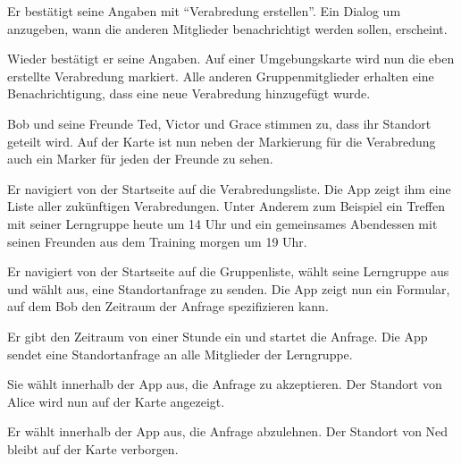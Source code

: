 \documentclass[parskip=full,11pt]{scrartcl}
\begin{document}
{Er bestätigt seine Angaben mit \enquote{Verabredung erstellen}.}
{Ein Dialog um anzugeben, wann die anderen Mitglieder benachrichtigt werden sollen, erscheint.}

{Wieder bestätigt er seine Angaben.}
{Auf einer Umgebungskarte wird nun die eben erstellte Verabredung markiert.
Alle anderen Gruppenmitglieder erhalten eine Benachrichtigung,
dass eine neue Verabredung hinzugefügt wurde.}

{Bob und seine Freunde Ted, Victor und Grace stimmen zu, dass ihr Standort geteilt wird.}
{Auf der Karte ist nun neben der Markierung für die Verabredung auch ein Marker für
jeden der Freunde zu sehen.}


{Er navigiert von der Startseite auf die Verabredungsliste.}
{Die App zeigt ihm eine Liste aller zukünftigen Verabredungen.
Unter Anderem zum Beispiel ein Treffen mit seiner Lerngruppe heute um 14 Uhr
und ein gemeinsames Abendessen mit seinen Freunden aus dem Training morgen um 19 Uhr.}


{Er navigiert von der Startseite auf die Gruppenliste, wählt seine Lerngruppe aus und wählt aus, eine Standortanfrage zu senden.}
{Die App zeigt nun ein Formular, auf dem Bob den Zeitraum der Anfrage spezifizieren kann.}

{Er gibt den Zeitraum von einer Stunde ein und startet die Anfrage.}
{Die App sendet eine Standortanfrage an alle Mitglieder der Lerngruppe.}

{Sie wählt innerhalb der App aus, die Anfrage zu akzeptieren.}
{Der Standort von Alice wird nun auf der Karte angezeigt.}

{Er wählt innerhalb der App aus, die Anfrage abzulehnen.}
{Der Standort von Ned bleibt auf der Karte verborgen.}
\end{document}
